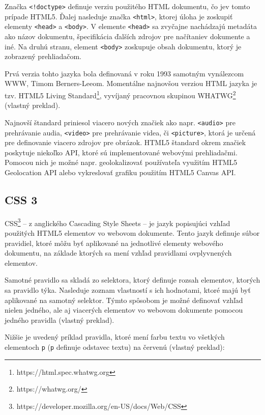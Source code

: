 Značka \texttt{<!doctype>} definuje verziu použitého HTML dokumentu, čo je\newline v tomto prípade HTML5. Ďalej nasleduje značka \texttt{<html>}, ktorej úloha je zoskupiť elementy \texttt{<head>} a \texttt{<body>}. V elemente \texttt{<head>} sa zvyčajne nachádzajú metadáta ako názov dokumentu, špecifikácia ďalších zdrojov pre načítanie\newline v dokumente a iné. Na druhú stranu, element \texttt{<body>} zoskupuje obsah dokumentu, ktorý je zobrazený prehliadačom.

Prvá verzia tohto jazyka bola definovaná v roku 1993 samotným vynálezcom WWW, Timom Berners-Leeom. Momentálne najnovšou verziou HTML jazyka je tzv. HTML5 Living Standard\footnote{https://html.spec.whatwg.org}, vyvíjaný pracovnou skupinou WHATWG\footnote{https://whatwg.org/} \cite{html_standard} (vlastný preklad).

Najnovší štandard priniesol viacero nových značiek ako napr. \texttt{<audio>} pre prehrávanie audia, \texttt{<video>} pre prehrávanie videa, či \texttt{<picture>}, ktorá je určená pre definovanie viacero zdrojov pre obrázok. HTML5 štandard okrem značiek poskytuje niekoľko API, ktoré sú implementované webovými prehliadačmi. Pomocou nich je možné napr. geolokalizovať používateľa využitím HTML5 Geolocation API alebo vykreslovať grafiku použitím HTML5 Canvas API.

\clearpage

\subsection {CSS 3}
CSS\footnote{https://developer.mozilla.org/en-US/docs/Web/CSS} -- z anglického Cascading Style Sheets -- je jazyk popisujúci vzhľad použitých HTML5 elementov vo webovom dokumente. Tento jazyk definuje súbor pravidiel, ktoré môžu byť aplikované na jednotlivé elementy webového dokumentu, na základe ktorých sa mení vzhľad pravidlami ovplyvnených elementov.

Samotné pravidlo sa skladá zo selektora, ktorý definuje rozsah elementov, ktorých sa pravidlo týka. Nasleduje zoznam vlastností s ich hodnotami, ktoré majú byť aplikované na samotný selektor. Týmto spôsobom je možné definovať vzhľad nielen jedného, ale aj viacerých elementov vo webovom dokumente pomocou jedného pravidla \cite{css_basics} (vlastný preklad).

Nižšie je uvedený príklad pravidla, ktoré mení farbu textu vo všetkých elementoch \texttt{p} (\texttt{p} definuje odstavec textu) na červenú \cite{css_basics} (vlastný preklad):

